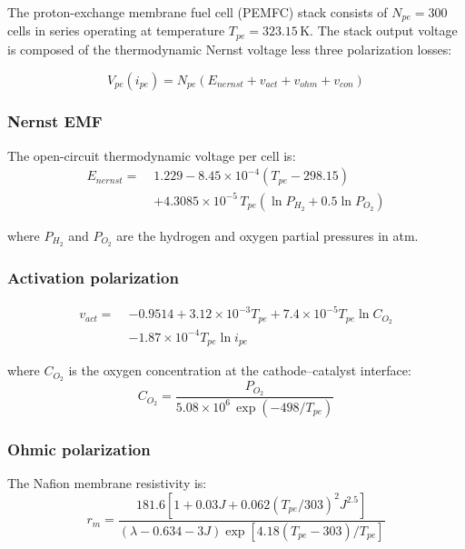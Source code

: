 \documentclass[journal]{IEEEtran}
\begin{document}
The proton-exchange membrane fuel cell (PEMFC) stack consists of $N_{pe} = 300$
cells in series operating at temperature $T_{pe} = 323.15$\,K. The stack
output voltage is composed of the thermodynamic Nernst voltage less three
polarization losses:

\begin{equation}
V_{pe}(i_{pe}) = N_{pe}\!\left(E_{nernst} + v_{act} + v_{ohm} + v_{con}\right)
\label{eq:fc_voltage}
\end{equation}

\subsubsection*{Nernst EMF}
The open-circuit thermodynamic voltage per cell is:
\begin{equation}
\begin{split}
    E_{nernst} = \; & 1.229 - 8.45\!\times\!10^{-4}(T_{pe}-298.15)\\
             & + 4.3085\!\times\!10^{-5}\,T_{pe}\!\left(\ln P_{H_2}+0.5\ln P_{O_2}\right)    
\end{split}
\label{eq:fc_nernst}
\end{equation}

where $P_{H_2}$ and $P_{O_2}$ are the hydrogen and oxygen partial pressures
in atm.

\subsubsection*{Activation polarization}
\begin{equation}
\begin{split}
v_{act} = \; & -0.9514 + 3.12\!\times\!10^{-3}T_{pe}
          + 7.4\!\times\!10^{-5}T_{pe}\ln C_{O_2} \\
          &- 1.87\!\times\!10^{-4}T_{pe}\ln i_{pe}    
\end{split}
\label{eq:fc_vact}
\end{equation}

where $C_{O_2}$ is the oxygen concentration at the cathode--catalyst
interface:
\begin{equation}
C_{O_2} = \frac{P_{O_2}}{5.08\!\times\!10^6\,\exp(-498/T_{pe})}
\label{eq:fc_co2}
\end{equation}

\subsubsection*{Ohmic polarization}
The Nafion membrane resistivity is:
\begin{equation}
r_m = \frac{181.6\!\left[1 + 0.03J + 0.062(T_{pe}/303)^2 J^{2.5}\right]}
           {(\lambda - 0.634 - 3J)\exp\!\left[4.18(T_{pe}-303)/T_{pe}\right]}
\label{eq:fc_rm}
\end{equation}
\end{document}

